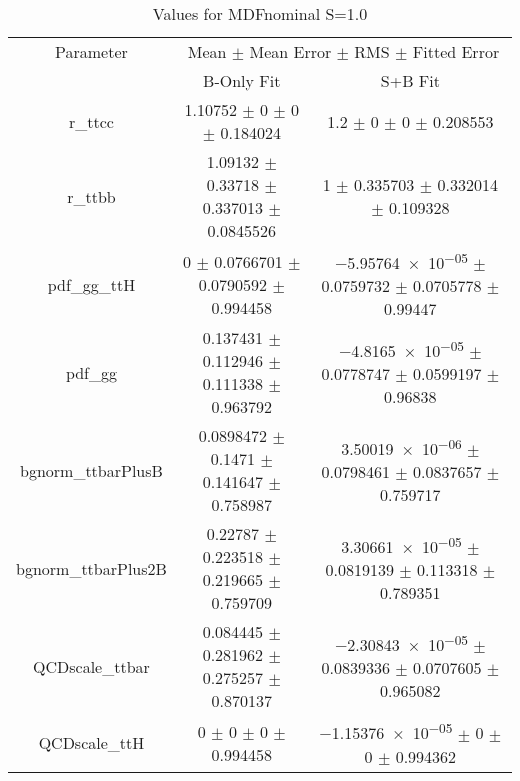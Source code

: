 \begin{table}
\centering
\caption{Values for MDFnominal S=1.0}
\begin{tabular}{ccc}
\toprule
Parameter & \multicolumn{2}{c}{Mean $\pm$ Mean Error $\pm$ RMS $\pm$ Fitted Error}\\
 & B-Only Fit & S+B Fit\\
\midrule
r\_ttcc & \num{1.10752} $\pm$ \num{0} $\pm$ \num{0} $\pm$ \num{0.184024} & \num{1.2} $\pm$ \num{0} $\pm$ \num{0} $\pm$ \num{0.208553}\\
r\_ttbb & \num{1.09132} $\pm$ \num{0.33718} $\pm$ \num{0.337013} $\pm$ \num{0.0845526} & \num{1} $\pm$ \num{0.335703} $\pm$ \num{0.332014} $\pm$ \num{0.109328}\\
pdf\_gg\_ttH & \num{0} $\pm$ \num{0.0766701} $\pm$ \num{0.0790592} $\pm$ \num{0.994458} & \num{-5.95764e-05} $\pm$ \num{0.0759732} $\pm$ \num{0.0705778} $\pm$ \num{0.99447}\\
pdf\_gg & \num{0.137431} $\pm$ \num{0.112946} $\pm$ \num{0.111338} $\pm$ \num{0.963792} & \num{-4.8165e-05} $\pm$ \num{0.0778747} $\pm$ \num{0.0599197} $\pm$ \num{0.96838}\\
bgnorm\_ttbarPlusB & \num{0.0898472} $\pm$ \num{0.1471} $\pm$ \num{0.141647} $\pm$ \num{0.758987} & \num{3.50019e-06} $\pm$ \num{0.0798461} $\pm$ \num{0.0837657} $\pm$ \num{0.759717}\\
bgnorm\_ttbarPlus2B & \num{0.22787} $\pm$ \num{0.223518} $\pm$ \num{0.219665} $\pm$ \num{0.759709} & \num{3.30661e-05} $\pm$ \num{0.0819139} $\pm$ \num{0.113318} $\pm$ \num{0.789351}\\
QCDscale\_ttbar & \num{0.084445} $\pm$ \num{0.281962} $\pm$ \num{0.275257} $\pm$ \num{0.870137} & \num{-2.30843e-05} $\pm$ \num{0.0839336} $\pm$ \num{0.0707605} $\pm$ \num{0.965082}\\
QCDscale\_ttH & \num{0} $\pm$ \num{0} $\pm$ \num{0} $\pm$ \num{0.994458} & \num{-1.15376e-05} $\pm$ \num{0} $\pm$ \num{0} $\pm$ \num{0.994362}\\
\bottomrule
\end{tabular}
\end{table}